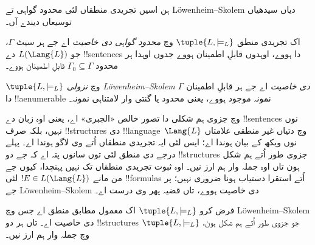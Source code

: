 \documentclass[../../../include/open-logic-section]{subfiles}
\begin{document}


ہن اسیں تجریدی منطقاں لئی محدود گواہی تے
L\"owenheim--Skolem دیاں سیدھیاں توسیعاں دیندے آں۔

\begin{defn}
اک تجریدی منطق $\tuple{L, \models_L}$ وچ \emph{محدود گواہی
  دی خاصیت} اے جے ہر سیٹ $\Gamma$، جو
$L(\Lang{L})$ دے !!{sentence}s دا ہووے، اوہدوں قابلِ اطمینان ہووے جدوں اوہدا
ہر محدود $\Gamma_0 \subseteq \Gamma$ قابلِ اطمینان ہووے۔
\end{defn}

\begin{defn}
$\tuple{L, \models_L}$ وچ \emph{نزولی L\"owenheim--Skolem
  دی خاصیت} اے جے ہر قابلِ اطمینان $\Gamma$ دا
!!a{enumerable} نمونہ موجود ہووے، یعنی محدود یا گنتی وار
لامتناہی نمونہ۔
\end{defn}


 وچ جزوی ہم شکلی دا تصور خالص
«الجبری» اے، یعنی اوہ زبان دے !!{sentence}s نوں
نہیں، بلکہ صرف !!{structure}s دی !!{language}~$\Lang{L}$
وچ دتیاں غیر منطقی علامتاں نوں ویکھ کے بیان ہوندا اے؛ ایس لئی ایہ
تجریدی منطقاں اُتے وی لاگو ہوندا اے۔ پہلے درجے دی منطق لئی
 توں سانوں پتہ اے کہ جے دو
!!{structure}s جزوی طور اُتے ہم شکل ہون تاں اوہ جملہ وار
ہم ارز نیں۔ اوہ ثبوت تجریدی منطقاں تک نہیں پہنچدا، کیوں جے
من مانے $!E \in L(\Lang{L})$ لئی !!{formula}s اُتے
استقرا دستیاب ہونا ضروری نہیں؛ پر جے L\"owenheim--Skolem دی
خاصیت ہووے، تاں قضیہ پھر وی درست اے۔

\begin{thm}
فرض کرو $\tuple{L, \models_L}$ اک معمول مطابق منطق اے جس وچ
L\"owenheim--Skolem دی خاصیت اے۔ تاں ہر دو !!{structure}s
جو جزوی طور اُتے ہم شکل ہون،
$\tuple{L,
  \models_L}$ وچ جملہ وار ہم ارز نیں۔
\end{thm}
\end{document}
